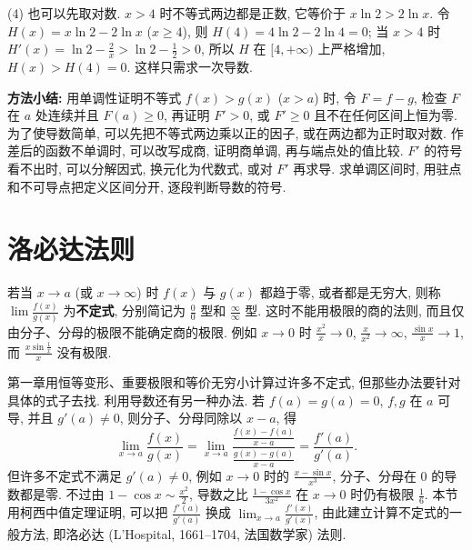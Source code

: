 \documentclass[UTF8,openany]{ctexbook}
\theoremstyle{chinesetextbook}
\begin{document}
(4) 也可以先取对数. $x>4$ 时不等式两边都是正数, 它等价于 $x\ln2>2\ln x$. 令 $H(x)=x\ln2-2\ln x$ ($x\ge4$), 则 $H(4)=4\ln2-2\ln4=0$; 当 $x>4$ 时 $\displaystyle H'(x)=\ln2-\frac2x>\ln2-\frac12>0$, 所以 $H$ 在 $[4,+\infty)$ 上严格增加, $H(x)>H(4)=0$. 这样只需求一次导数.
\par\indent\textbf{方法小结:} 用单调性证明不等式 $f(x)>g(x)$ ($x>a$) 时, 令 $F=f-g$, 检查 $F$ 在 $a$ 处连续并且 $F(a)\ge0$, 再证明 $F'>0$, 或 $F'\ge0$ 且不在任何区间上恒为零. 为了使导数简单, 可以先把不等式两边乘以正的因子, 或在两边都为正时取对数. 作差后的函数不单调时, 可以改写成商, 证明商单调, 再与端点处的值比较. $F'$ 的符号看不出时, 可以分解因式, 换元化为代数式, 或对 $F'$ 再求导. 求单调区间时, 用驻点和不可导点把定义区间分开, 逐段判断导数的符号.
\section{洛必达法则}
若当 $x\to a$ (或 $x\to\infty$) 时 $f(x)$ 与 $g(x)$ 都趋于零, 或者都是无穷大, 则称 $\displaystyle\lim\frac{f(x)}{g(x)}$ 为\textbf{不定式}, 分别简记为 $\displaystyle\frac00$ 型和 $\displaystyle\frac\infty\infty$ 型. 这时不能用极限的商的法则, 而且仅由分子、分母的极限不能确定商的极限. 例如 $x\to0$ 时 $\displaystyle\frac{x^2}x\to0$, $\displaystyle\frac x{x^2}\to\infty$, $\displaystyle\frac{\sin x}x\to1$, 而 $\displaystyle\frac{x\sin\frac1x}x$ 没有极限.

第一章用恒等变形、重要极限和等价无穷小计算过许多不定式, 但那些办法要针对具体的式子去找. 利用导数还有另一种办法. 若 $f(a)=g(a)=0$, $f,g$ 在 $a$ 可导, 并且 $g'(a)\ne0$, 则分子、分母同除以 $x-a$, 得
\[
\lim_{x\to a}\frac{f(x)}{g(x)}=\lim_{x\to a}\frac{\frac{f(x)-f(a)}{x-a}}{\frac{g(x)-g(a)}{x-a}}=\frac{f'(a)}{g'(a)}.
\]
但许多不定式不满足 $g'(a)\ne0$, 例如 $x\to0$ 时的 $\displaystyle\frac{x-\sin x}{x^3}$, 分子、分母在 $0$ 的导数都是零. 不过由 $\displaystyle1-\cos x\sim\frac{x^2}2$, 导数之比 $\displaystyle\frac{1-\cos x}{3x^2}$ 在 $x\to0$ 时仍有极限 $\displaystyle\frac16$. 本节用柯西中值定理证明, 可以把 $\displaystyle\frac{f'(a)}{g'(a)}$ 换成 $\displaystyle\lim_{x\to a}\frac{f'(x)}{g'(x)}$, 由此建立计算不定式的一般方法, 即洛必达 (L'Hospital, 1661--1704, 法国数学家) 法则.
\end{document}
